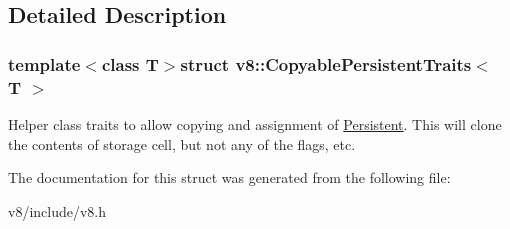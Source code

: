 \subsection{Detailed Description}
\subsubsection*{template$<$class T$>$struct v8\+::\+Copyable\+Persistent\+Traits$<$ T $>$}

Helper class traits to allow copying and assignment of \hyperlink{classv8_1_1Persistent}{Persistent}. This will clone the contents of storage cell, but not any of the flags, etc. 

The documentation for this struct was generated from the following file\+:\begin{DoxyCompactItemize}
\item 
v8/include/v8.\+h\end{DoxyCompactItemize}
